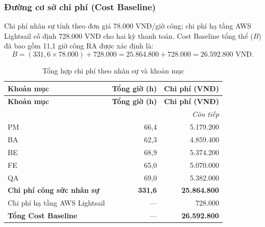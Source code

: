 \subsubsection{Đường cơ sở chi phí (Cost Baseline)}
Chi phí nhân sự tính theo đơn giá 78.000 VNĐ/giờ công; chi phí hạ tầng AWS Lightsail cố định 728.000 VNĐ cho hai kỳ thanh toán. Cost Baseline tổng thể ($B$) đã bao gồm 11,1 giờ công RA được xác định là:
\[
B = (331{,}6 \times 78.000) + 728.000 = 25.864.800 + 728.000 = \boxed{26.592.800\text{ VNĐ}}.
\]
\begingroup\small
\setlength{\tabcolsep}{4pt}\renewcommand{\arraystretch}{1.15}
\begin{longtable}{@{}p{.45\linewidth}rr@{}}
\caption{Tổng hợp chi phí theo nhân sự và khoản mục}\label{tab:costtotal}\\
\toprule
\textbf{Khoản mục} & \textbf{Tổng giờ (h)} & \textbf{Chi phí (VNĐ)} \\
\midrule\endfirsthead
\toprule
\textbf{Khoản mục} & \textbf{Tổng giờ (h)} & \textbf{Chi phí (VNĐ)} \\
\midrule\endhead
\midrule\multicolumn{3}{r}{\textit{Còn tiếp}}\\\endfoot
\bottomrule\endlastfoot
PM & 66,4 & 5.179.200 \\
BA & 62,3 & 4.859.400 \\
BE & 68,9 & 5.374.200 \\
FE & 65,0 & 5.070.000 \\
QA & 69,0 & 5.382.000 \\
\textbf{Chi phí công sức nhân sự} & \textbf{331,6} & \textbf{25.864.800} \\
Chi phí hạ tầng AWS Lightsail & --- & 728.000 \\
\textbf{Tổng Cost Baseline} & --- & \textbf{26.592.800} \\
\end{longtable}\endgroup

